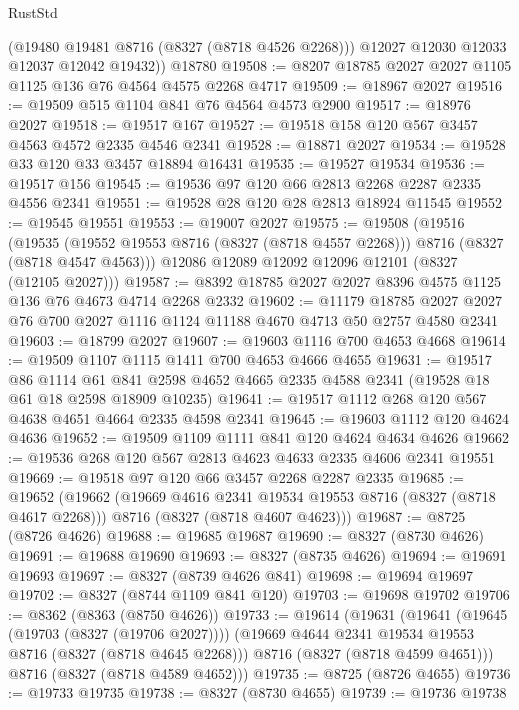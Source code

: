 \begin{lexlean}{RustStd}
\begin{coremodule}
{\begin{coremodule}
{{{{{{{{{{{{{{{{{{{{{{{{{{{{{{{{{{{{{{{{{{{{{{{{{{{{{{        (@19480 @19481 @8716 (@8327 (@8718 @4526 @2268)))
        @12027
        @12030
        @12033
        @12037
        @12042
        @19432))
    @18780
@19508 := @8207 @18785 @2027 @2027 @1105 @1125 @136 @76 @4564 @4575 @2268 @4717
@19509 := @18967 @2027
@19516 := @19509 @515 @1104 @841 @76 @4564 @4573 @2900
@19517 := @18976 @2027
@19518 := @19517 @167
@19527 := @19518 @158 @120 @567 @3457 @4563 @4572 @2335 @4546 @2341
@19528 := @18871 @2027
@19534 := @19528 @33 @120 @33 @3457 @18894 @16431
@19535 := @19527 @19534
@19536 := @19517 @156
@19545 := @19536 @97 @120 @66 @2813 @2268 @2287 @2335 @4556 @2341
@19551 := @19528 @28 @120 @28 @2813 @18924 @11545
@19552 := @19545 @19551
@19553 := @19007 @2027
@19575 := @19508
    (@19516
      (@19535 (@19552 @19553 @8716 (@8327 (@8718 @4557 @2268))) @8716 (@8327 (@8718 @4547 @4563)))
      @12086
      @12089
      @12092
      @12096
      @12101
      (@8327 (@12105 @2027)))
@19587 := @8392 @18785 @2027 @2027 @8396 @4575 @1125 @136 @76 @4673 @4714 @2268 @2332
@19602 := @11179
    @18785
    @2027
    @2027
    @76
    @700
    @2027
    @1116
    @1124
    @11188
    @4670
    @4713
    @50
    @2757
    @4580
    @2341
@19603 := @18799 @2027
@19607 := @19603 @1116 @700 @4653 @4668
@19614 := @19509 @1107 @1115 @1411 @700 @4653 @4666 @4655
@19631 := @19517
    @86
    @1114
    @61
    @841
    @2598
    @4652
    @4665
    @2335
    @4588
    @2341
    (@19528 @18 @61 @18 @2598 @18909 @10235)
@19641 := @19517 @1112 @268 @120 @567 @4638 @4651 @4664 @2335 @4598 @2341
@19645 := @19603 @1112 @120 @4624 @4636
@19652 := @19509 @1109 @1111 @841 @120 @4624 @4634 @4626
@19662 := @19536 @268 @120 @567 @2813 @4623 @4633 @2335 @4606 @2341 @19551
@19669 := @19518 @97 @120 @66 @3457 @2268 @2287 @2335
@19685 := @19652
    (@19662
      (@19669 @4616 @2341 @19534 @19553 @8716 (@8327 (@8718 @4617 @2268)))
      @8716
      (@8327 (@8718 @4607 @4623)))
@19687 := @8725 (@8726 @4626)
@19688 := @19685 @19687
@19690 := @8327 (@8730 @4626)
@19691 := @19688 @19690
@19693 := @8327 (@8735 @4626)
@19694 := @19691 @19693
@19697 := @8327 (@8739 @4626 @841)
@19698 := @19694 @19697
@19702 := @8327 (@8744 @1109 @841 @120)
@19703 := @19698 @19702
@19706 := @8362 (@8363 (@8750 @4626))
@19733 := @19614
    (@19631
      (@19641
        (@19645 (@19703 (@8327 (@19706 @2027))))
        (@19669 @4644 @2341 @19534 @19553 @8716 (@8327 (@8718 @4645 @2268)))
        @8716
        (@8327 (@8718 @4599 @4651)))
      @8716
      (@8327 (@8718 @4589 @4652)))
@19735 := @8725 (@8726 @4655)
@19736 := @19733 @19735
@19738 := @8327 (@8730 @4655)
@19739 := @19736 @19738
}}}}}}}}}}}}}}}}}}}}}}}}}}}}}}}}}}}}}}}}}}}}}}}}}}}}}}
\end{coremodule}}
\end{coremodule}
\end{lexlean}
